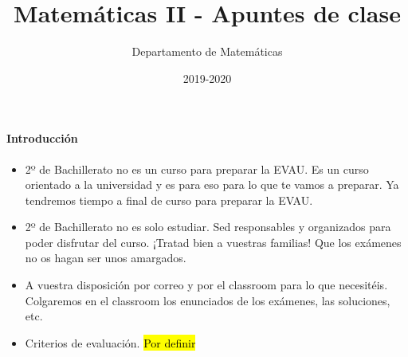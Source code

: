 \documentclass[nobuilddate]{Docencia}
\title{Matemáticas II - Apuntes de clase}
\author{Departamento de Matemáticas}
\date{2019-2020}
\begin{document}
\pagestyle{plain}
\maketitle
\tableofcontents
\newpage

\newcommand{\hide}[1]{#1}

\renewcommand{\vec}[1]{\overrightarrow{#1}}

\paragraph{Introducción}

\begin{itemize}
    \item 2º de Bachillerato no es un curso para preparar la EVAU. Es un curso orientado a la universidad y es para eso para lo que te vamos a preparar. 
    Ya tendremos tiempo a final de curso para preparar la EVAU.
    
    \item 2º de Bachillerato no es solo estudiar. Sed responsables y organizados para poder disfrutar del curso. ¡Tratad bien a vuestras familias! Que los exámenes no os hagan ser unos amargados.
    
    \item A vuestra disposición por correo y por el classroom para lo que necesitéis. Colgaremos en el classroom los enunciados de los exámenes, las soluciones, etc.
    
    \item Criterios de evaluación. \hl{Por definir}
\end{itemize}







\newpage
\printindex
\listoffigures
\listoftables
\end{document}
